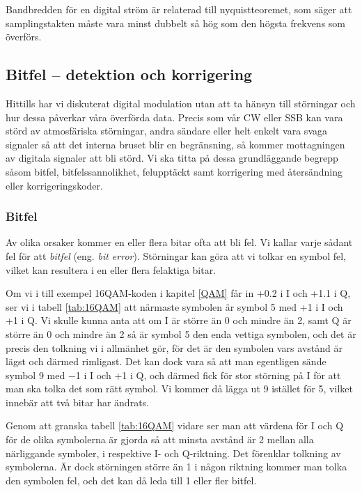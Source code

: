 Bandbredden för en digital ström är relaterad till nyquistteoremet, som säger
att samplingstakten måste vara minst dubbelt så hög som den högsta frekvens
som överförs.

\subsection{Bitfel -- detektion och korrigering}

Hittills har vi diskuterat digital modulation utan att ta hänsyn till
störningar och hur dessa påverkar våra överförda data. Precis som
vår CW eller SSB kan vara störd av atmosfäriska störningar, andra sändare
eller helt enkelt vara svaga signaler så att det interna bruset blir en
begränsning, så kommer mottagningen av digitala signaler att bli störd.
Vi ska titta på dessa grundläggande begrepp såsom bitfel, bitfelssannolikhet,
felupptäckt samt korrigering med återsändning eller korrigeringskoder.

\subsubsection{Bitfel}

Av olika orsaker kommer en eller flera bitar ofta att bli fel.
Vi kallar varje sådant fel för att \emph{bitfel} (eng. \emph{bit error}).
Störningar kan göra att vi tolkar en symbol fel, vilket kan resultera i en eller
flera felaktiga bitar.

Om vi i till exempel 16QAM-koden i kapitel \ref{QAM} får in +0.2 i I och +1.1 i Q,
ser vi i tabell \ref{tab:16QAM} att närmaste symbolen är symbol 5 med +1 i I
och +1 i Q. Vi skulle kunna anta att om I är större än 0 och mindre än 2, samt
Q är större än 0 och mindre än 2 så är symbol 5 den enda vettiga symbolen, och
det är precis den tolkning vi i allmänhet gör, för det är den symbolen vars
avstånd är lägst och därmed rimligast.
Det kan dock vara så att man egentligen sände symbol 9 med \num{-1} i I och +1 i
Q, och därmed fick för stor störning på I för att man ska tolka det som rätt
symbol.
Vi kommer då lägga ut 9 istället för 5, vilket innebär att två bitar har
ändrats.

Genom att granska tabell \ref{tab:16QAM} vidare ser man att värdena för
I och Q för de olika symbolerna är gjorda så att minsta avstånd är 2 mellan
alla närliggande symboler, i respektive I- och Q-riktning. Det förenklar
tolkning av symbolerna. Är dock störningen större än 1 i någon riktning
kommer man tolka den symbolen fel, och det kan då leda till 1 eller fler
bitfel.

